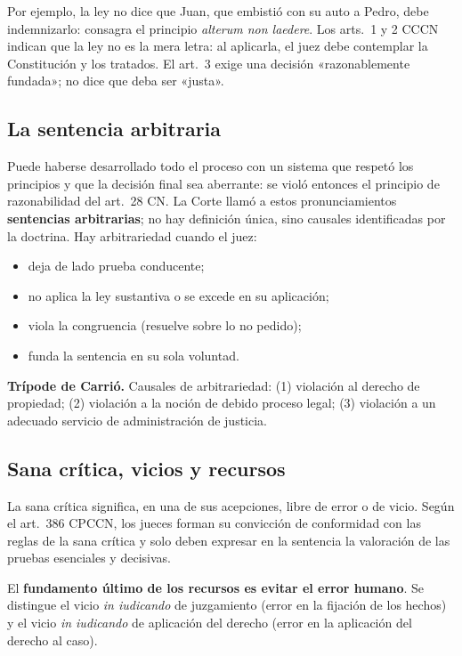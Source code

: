 \documentclass[12pt,oneside]{book}
\begin{document}
Por ejemplo, la ley no dice que Juan, que embistió con su auto a Pedro, debe indemnizarlo: consagra el principio \textit{alterum non laedere}. Los arts.~1 y 2 CCCN indican que la ley no es la mera letra: al aplicarla, el juez debe contemplar la Constitución y los tratados. El art.~3 exige una decisión «razonablemente fundada»; no dice que deba ser «justa».

\subsection{La sentencia arbitraria}

Puede haberse desarrollado todo el proceso con un sistema que respetó los principios y que la decisión final sea aberrante: se violó entonces el principio de razonabilidad del art.~28 CN. La Corte llamó a estos pronunciamientos \textbf{sentencias arbitrarias}; no hay definición única, sino causales identificadas por la doctrina. Hay arbitrariedad cuando el juez:

\begin{itemize}
\item deja de lado prueba conducente;
\item no aplica la ley sustantiva o se excede en su aplicación;
\item viola la congruencia (resuelve sobre lo no pedido);
\item funda la sentencia en su sola voluntad.
\end{itemize}

\begin{importante}
\textbf{Trípode de Carrió.} Causales de arbitrariedad: (1) violación al derecho de propiedad; (2) violación a la noción de debido proceso legal; (3) violación a un adecuado servicio de administración de justicia.
\end{importante}

\subsection{Sana crítica, vicios y recursos}

La sana crítica significa, en una de sus acepciones, libre de error o de vicio. Según el art.~386 CPCCN, los jueces forman su convicción de conformidad con las reglas de la sana crítica y solo deben expresar en la sentencia la valoración de las pruebas esenciales y decisivas.

El \textbf{fundamento último de los recursos es evitar el error humano}. Se distingue el vicio \textit{in iudicando} de juzgamiento (error en la fijación de los hechos) y el vicio \textit{in iudicando} de aplicación del derecho (error en la aplicación del derecho al caso). %
\end{document}
